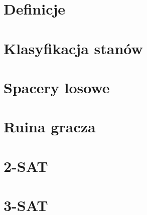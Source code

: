\section{Definicje}


\newpage
\section{Klasyfikacja stanów}


\newpage
\section{Spacery losowe}


\newpage
\section{Ruina gracza}


\newpage
\section{2-SAT}


\newpage
\section{3-SAT}

